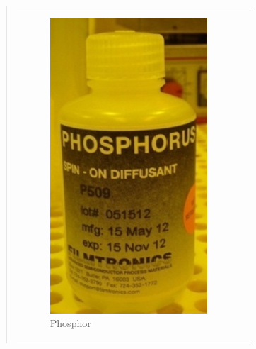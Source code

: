 \begin{quote}
\begin{center}
\begin{tabular}{ll}
                \hspace{-14em}
                    \begin{minipage}{0.6\textwidth}
                        \begin{figure}[H]
                        \hspace{8em}
                            \includegraphics[scale=0.7, trim = 0cm 0cm 0cm
                            0cm, clip]{./HerstellungBilder/Phosphorus.png}
                            \caption{Phosphor}
                           \label{fig:phos}
                        \end{figure}

                    \end{minipage}
                    \begin{minipage}{0.6\textwidth}


\end{minipage}
\end{tabular}
\end{center}
\end{quote}

